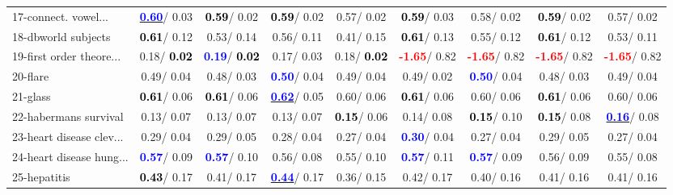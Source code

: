 \begin{table}[h]
\begin{center}
\begin{tabular}{lc|c|c|c|c|c|c|c}
17-connect. vowel... & \underline{\textcolor{blue}{\textbf{  0.60}}}/  0.03 & \textcolor{black}{\textbf{  0.59}}/  0.02 & \textcolor{black}{\textbf{  0.59}}/  0.02 &   0.57/  0.02 & \textcolor{black}{\textbf{  0.59}}/  0.03 &   0.58/  0.02 & \textcolor{black}{\textbf{  0.59}}/  0.02 &   0.57/  0.02 \\
18-dbworld subjects & \textcolor{black}{\textbf{  0.61}}/  0.12 &   0.53/  0.14 &   0.56/  0.11 &   0.41/  0.15 & \textcolor{black}{\textbf{  0.61}}/  0.13 &   0.55/  0.12 & \textcolor{black}{\textbf{  0.61}}/  0.12 &   0.53/  0.11 \\
19-first order theore... &   0.18/\textcolor{black}{\textbf{  0.02}} & \textcolor{blue}{\textbf{  0.19}}/\textcolor{black}{\textbf{  0.02}} &   0.17/  0.03 &   0.18/\textcolor{black}{\textbf{  0.02}} & \textcolor{red}{\textbf{ -1.65}}/  0.82 & \textcolor{red}{\textbf{ -1.65}}/  0.82 & \textcolor{red}{\textbf{ -1.65}}/  0.82 & \textcolor{red}{\textbf{ -1.65}}/  0.82 \\
20-flare &   0.49/  0.04 &   0.48/  0.03 & \textcolor{blue}{\textbf{  0.50}}/  0.04 &   0.49/  0.04 &   0.49/  0.02 & \textcolor{blue}{\textbf{  0.50}}/  0.04 &   0.48/  0.03 &   0.49/  0.04 \\
21-glass & \textcolor{black}{\textbf{  0.61}}/  0.06 & \textcolor{black}{\textbf{  0.61}}/  0.06 & \underline{\textcolor{blue}{\textbf{  0.62}}}/  0.05 &   0.60/  0.06 & \textcolor{black}{\textbf{  0.61}}/  0.06 &   0.60/  0.06 & \textcolor{black}{\textbf{  0.61}}/  0.06 &   0.60/  0.06 \\ \hline
22-habermans survival &   0.13/  0.07 &   0.13/  0.07 &   0.13/  0.07 & \textcolor{black}{\textbf{  0.15}}/  0.06 &   0.14/  0.08 & \textcolor{black}{\textbf{  0.15}}/  0.10 & \textcolor{black}{\textbf{  0.15}}/  0.08 & \underline{\textcolor{blue}{\textbf{  0.16}}}/  0.08 \\
23-heart disease clev... &   0.29/  0.04 &   0.29/  0.05 &   0.28/  0.04 &   0.27/  0.04 & \textcolor{blue}{\textbf{  0.30}}/  0.04 &   0.27/  0.04 &   0.29/  0.05 &   0.27/  0.04 \\
24-heart disease hung... & \textcolor{blue}{\textbf{  0.57}}/  0.09 & \textcolor{blue}{\textbf{  0.57}}/  0.10 &   0.56/  0.08 &   0.55/  0.10 & \textcolor{blue}{\textbf{  0.57}}/  0.11 & \textcolor{blue}{\textbf{  0.57}}/  0.09 &   0.56/  0.09 &   0.55/  0.08 \\
25-hepatitis & \textcolor{black}{\textbf{  0.43}}/  0.17 &   0.41/  0.17 & \underline{\textcolor{blue}{\textbf{  0.44}}}/  0.17 &   0.36/  0.15 &   0.42/  0.17 &   0.40/  0.16 &   0.41/  0.16 &   0.41/  0.16 \\

\end{tabular}
\end{center}
\end{table}
